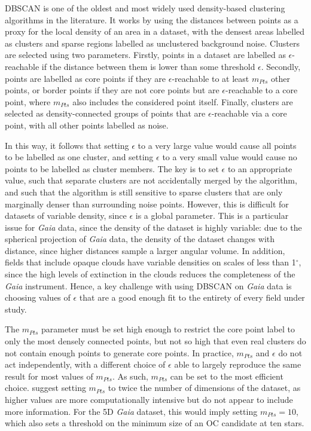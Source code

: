 DBSCAN \citep{ester_density-based_1996} is one of the oldest and most widely used density-based clustering algorithms in the literature. It works by using the distances between points as a proxy for the local density of an area in a dataset, with the densest areas labelled as clusters and sparse regions labelled as unclustered background noise. Clusters are selected using two parameters. Firstly, points in a dataset are labelled as $\epsilon$-reachable if the distance between them is lower than some threshold $\epsilon$. Secondly, points are labelled as core points if they are $\epsilon$-reachable to at least $m_{Pts}$ other points, or border points if they are not core points but are $\epsilon$-reachable to a core point, where $m_{Pts}$ also includes the considered point itself. Finally, clusters are selected as density-connected groups of points that are $\epsilon$-reachable via a core point, with all other points labelled as noise.

In this way, it follows that setting $\epsilon$ to a very large value would cause all points to be labelled as one cluster, and setting $\epsilon$ to a very small value would cause no points to be labelled as cluster members. The key is to set $\epsilon$ to an appropriate value, such that separate clusters are not accidentally merged by the algorithm, and such that the algorithm is still sensitive to sparse clusters that are only marginally denser than surrounding noise points. However, this is difficult for datasets of variable density, since $\epsilon$ is a global parameter. This is a particular issue for \emph{Gaia} data, since the density of the dataset is highly variable: due to the spherical projection of \emph{Gaia} data, the density of the dataset changes with distance, since higher distances sample a larger angular volume. In addition, fields that include opaque clouds have variable densities on scales of less than 1$^\circ$, since the high levels of extinction in the clouds reduces the completeness of the \emph{Gaia} instrument. Hence, a key challenge with using DBSCAN on \emph{Gaia} data is choosing values of $\epsilon$ that are a good enough fit to the entirety of every field under study.

The $m_{Pts}$ parameter must be set high enough to restrict the core point label to only the most densely connected points, but not so high that even real clusters do not contain enough points to generate core points. In practice, $m_{Pts}$ and $\epsilon$ do not act independently, with a different choice of $\epsilon$ able to largely reproduce the same result for most values of $m_{Pts}$. As such, $m_{Pts}$ can be set to the most efficient choice. \cite{ester_density-based_1996} suggest setting $m_{Pts}$ to twice the number of dimensions of the dataset, as higher values are more computationally intensive but do not appear to include more information. For the 5D \emph{Gaia} dataset, this would imply setting $m_{Pts}=10$, which also sets a threshold on the minimum size of an OC candidate at ten stars.

